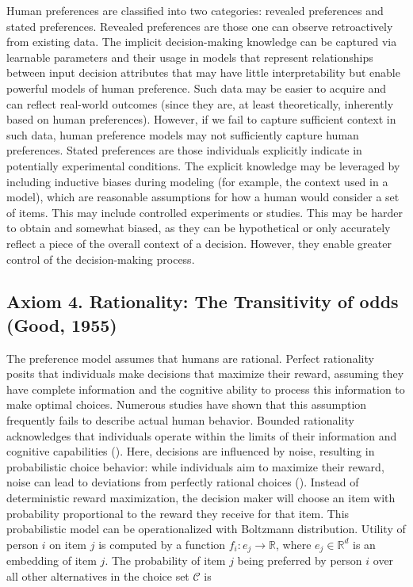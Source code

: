 \documentclass[
  letterpaper,
  numbers=noenddot,
  DIV=11]{scrreprt}
\theoremstyle{plain}
\theoremstyle{definition}
\theoremstyle{remark}
\begin{document}
Human preferences are classified into two categories: revealed
preferences and stated preferences. Revealed preferences are those one
can observe retroactively from existing data. The implicit
decision-making knowledge can be captured via learnable parameters and
their usage in models that represent relationships between input
decision attributes that may have little interpretability but enable
powerful models of human preference. Such data may be easier to acquire
and can reflect real-world outcomes (since they are, at least
theoretically, inherently based on human preferences). However, if we
fail to capture sufficient context in such data, human preference models
may not sufficiently capture human preferences. Stated preferences are
those individuals explicitly indicate in potentially experimental
conditions. The explicit knowledge may be leveraged by including
inductive biases during modeling (for example, the context used in a
model), which are reasonable assumptions for how a human would consider
a set of items. This may include controlled experiments or studies. This
may be harder to obtain and somewhat biased, as they can be hypothetical
or only accurately reflect a piece of the overall context of a decision.
However, they enable greater control of the decision-making process.

\subsection{Axiom 4. Rationality: The Transitivity of odds (Good,
1955)}\label{human-rationality}

The preference model assumes that humans are rational. Perfect
rationality posits that individuals make decisions that maximize their
reward, assuming they have complete information and the cognitive
ability to process this information to make optimal choices. Numerous
studies have shown that this assumption frequently fails to describe
actual human behavior. Bounded rationality acknowledges that individuals
operate within the limits of their information and cognitive
capabilities (). Here,
decisions are influenced by noise, resulting in probabilistic choice
behavior: while individuals aim to maximize their reward, noise can lead
to deviations from perfectly rational choices
(). Instead of
deterministic reward maximization, the decision maker will choose an
item with probability proportional to the reward they receive for that
item. This probabilistic model can be operationalized with Boltzmann
distribution. Utility of person \(i\) on item \(j\) is computed by a
function \(f_i: e_j \rightarrow \mathbb{R}\), where
\(e_j \in \mathbb{R}^d\) is an embedding of item \(j\). The probability
of item \(j\) being preferred by person \(i\) over all other
alternatives in the choice set \(\mathcal{C}\) is
\end{document}
